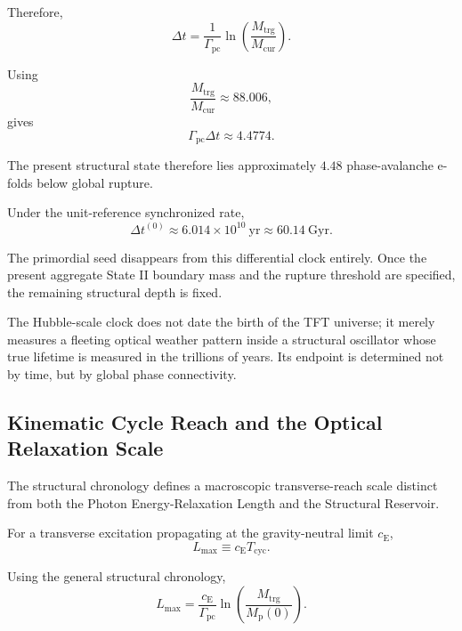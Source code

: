 Therefore,
\begin{equation}
    \Delta t
    =
    \frac{1}{\Gamma_{\mathrm{pc}}}
    \ln\left(
        \frac{M_{\mathrm{trg}}}
        {M_{\mathrm{cur}}}
    \right).
\end{equation}

Using
\begin{equation}
    \frac{M_{\mathrm{trg}}}
    {M_{\mathrm{cur}}}
    \approx
    88.006,
\end{equation}
gives
\begin{equation}
    \Gamma_{\mathrm{pc}}\Delta t
    \approx
    4.4774.
\end{equation}

The present structural state therefore lies approximately $4.48$ phase-avalanche e-folds below global rupture.

Under the unit-reference synchronized rate,
\begin{equation}
    \Delta t^{(0)}
    \approx
    6.014\times10^{10}\ \mathrm{yr}
    \approx
    60.14\ \mathrm{Gyr}.
\end{equation}

The primordial seed disappears from this differential clock entirely. Once the present aggregate State II boundary mass and the rupture threshold are specified, the remaining structural depth is fixed.

The Hubble-scale clock does not date the birth of the TFT universe; it merely measures a fleeting optical weather pattern inside a structural oscillator whose true lifetime is measured in the trillions of years. Its endpoint is determined not by time, but by global phase connectivity.

\subsection{Kinematic Cycle Reach and the Optical Relaxation Scale}
\label{sec:causal_distance}

The structural chronology defines a macroscopic transverse-reach scale distinct from both the Photon Energy-Relaxation Length and the Structural Reservoir.

For a transverse excitation propagating at the gravity-neutral limit $c_{\mathrm E}$,
\begin{equation}
    L_{\mathrm{max}}
    \equiv
    c_{\mathrm E}T_{\mathrm{cyc}}.
\end{equation}

Using the general structural chronology,
\begin{equation}
    L_{\mathrm{max}}
    =
    \frac{c_{\mathrm E}}
    {\Gamma_{\mathrm{pc}}}
    \ln\left(
        \frac{M_{\mathrm{trg}}}
        {M_{\mathrm p}(0)}
    \right).
\end{equation}

